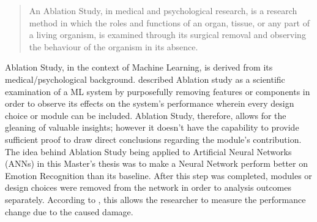 \begin{quote}
    An Ablation Study, in medical and psychological research, is a research method in which the roles and functions of an organ, tissue, or any part of a living organism, is examined through its surgical removal and observing the behaviour of the organism in its absence.\citep[~p. 15]{Sheikholeslami:2019:AblationProgrammingML}
\end{quote}


Ablation Study, in the context of Machine Learning, is derived from its medical/psychological background. \citet{Sheikholeslami:2019:AblationProgrammingML} described Ablation study as a scientific examination of a \gls{ML} system by purposefully removing features or components in order to observe its effects on the system's performance wherein every design choice or module can be included. Ablation Study, therefore, allows for the gleaning of valuable insights; however it doesn't have the capability to provide sufficient proof to draw direct conclusions regarding the module's contribution.
\newline\newline
The idea behind Ablation Study being applied to Artificial Neural Networks (ANNs) in this Master's thesis was to make a Neural Network perform better on Emotion Recognition than its baseline. After this step was completed, modules or design choices were removed from the network in order to analysis outcomes separately. According to \citet{Fadelli:2018:AblationInANN}, this allows the researcher to measure the performance change due to the caused damage.


